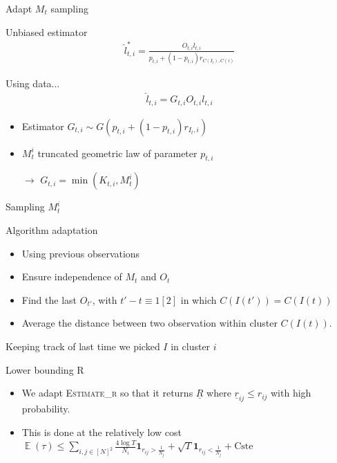 \documentclass[11pt]{beamer}
\DeclareMathOperator*{\expect}{\mathbb{E}}
\begin{document}
\begin{frame}{Adapt $M_t$ sampling}
\begin{block}{Unbiased estimator}
\begin{align*}
\hat{l}_{t,i}^{*} = \frac{O_{t,i}l_{t,i}}{p_{t,i}+(1-p_{t,i})r_{C(I_t),C(i)}}
\end{align*}
\end{block}
\begin{block}{Using data...}
\begin{align}
\hat{l}_{t,i}=G_{t,i}O_{t,i}l_{t,i}
\end{align}
\begin{itemize}
\item Estimator $G_{t,i} \sim G(p_{t,i}+(1-p_{t,i})r_{I_t,i})$
\item $M_t^i$ truncated geometric law of parameter $p_{t,i}$
\item[$\rightarrow$] $G_{t,i}=\min\left(K_{t,i},M_t^i\right)$
\end{itemize}
\end{block}
\end{frame}

\begin{frame}{Sampling $M_t^i$}

\begin{block}{Algorithm adaptation}
\begin{itemize}
\item Using previous observations
\item Ensure independence of $M_t$ and $O_t$
\item Find the last $O_{t'}$, with $t' -t \equiv 1 [2]$ in which $C(I(t')) = C(I(t))$
\item Average the distance between two observation within cluster $C(I(t))$.
\end{itemize}
\end{block}

\alert{Keeping track of last time we picked $I$ in cluster $i$}

\end{frame}


\begin{frame}{Lower bounding R}
\begin{itemize}
\item We adapt \textsc{Estimate\_r} so that it returns $\underline{R}$ where $\underline{r}_{ij} \leq r_{ij}$ with high probability.
\item This is done at the relatively low cost $\expect\left({\tau}\right) \leq \sum_{i,j \in [N]^2} \frac{4\log T}{N_i} \mathbf{1}_{r_{ij} > \frac{1}{N_j}} + \sqrt{T} \mathbf{1}_{r_{ij} < \frac{1}{N_j}}+ \mathrm{Cste}$
\end{itemize}
\end{frame}
\end{document}
